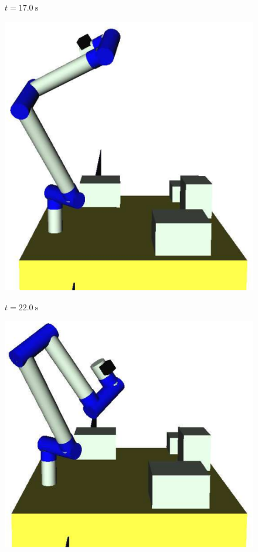 \begin{figure}[t]
\begin{minipage}[h]{0.28\linewidth}
    \centering
    \par\footnotesize{$t = 17.0~\mathrm{s}$}
  \end{minipage}
  \begin{minipage}[h]{0.28\linewidth}
    \includegraphics[width=1.0\linewidth]{fig/chapter4/deployment/05.eps}
    \centering
    \par\footnotesize{$t = 22.0~\mathrm{s}$}
  \end{minipage}
  \begin{minipage}[h]{0.28\linewidth}
      \includegraphics[width=1.0\linewidth]{fig/chapter4/deployment/06.eps}

\end{minipage}
\end{figure}
